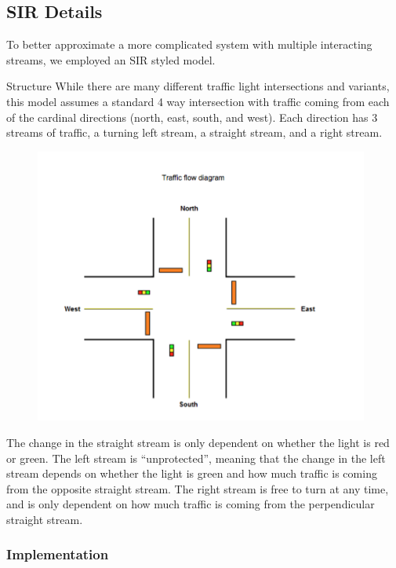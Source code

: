 \documentclass[12pt]{article}
\begin{document}
\subsection{SIR Details}
To better approximate a more complicated system with multiple interacting streams, we employed an SIR styled model. 

Structure
While there are many different traffic light intersections and variants, this model assumes a standard 4 way intersection with traffic coming from each of the cardinal directions (north, east, south, and west). Each direction has 3 streams of traffic, a turning left stream, a straight stream, and a right stream. 

\begin{figure}[htp]
    \centering
    \includegraphics[width=11cm]{figures/TrafficDiagrampng.png}
    \label{fig:diagram}
\end{figure}

The change in the straight stream is only dependent on whether the light is red or green. The left stream is “unprotected”, meaning that the change in the left stream depends on whether the light is green and how much traffic is coming from the opposite straight stream. The right stream is free to turn at any time, and is only dependent on how much traffic is coming from the perpendicular straight stream.

\subsubsection{Implementation}
\end{document}

